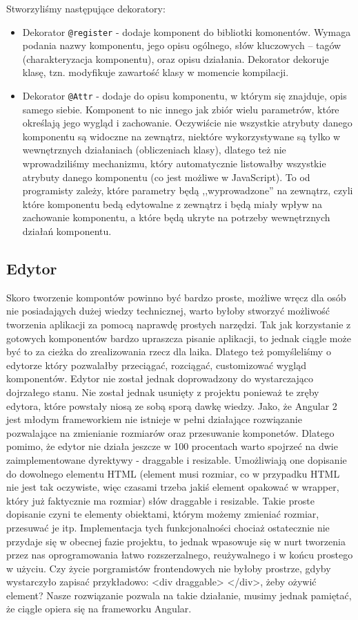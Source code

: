 \documentclass[licencjacka]{pracamgr}
\begin{document}
Stworzyliśmy następujące dekoratory:
\begin{itemize}
	\item Dekorator \texttt{@register} - dodaje komponent do bibliotki komonentów. Wymaga podania nazwy komponentu,
jego opisu ogólnego, słów kluczowych -- tagów (charakteryzacja komponentu),
oraz opisu działania. Dekorator dekoruje klasę, tzn. modyfikuje zawartość
klasy w momencie kompilacji.

	\item Dekorator \texttt{@Attr} - dodaje do opisu komponentu, w którym się znajduje, opis samego siebie.
Komponent to nic innego jak zbiór wielu parametrów, które określają jego wygląd i zachowanie.
Oczywiście nie wszystkie atrybuty danego komponentu są widoczne na zewnątrz, niektóre wykorzystywane
są tylko w wewnętrznych działaniach (obliczeniach klasy), dlatego też nie wprowadziliśmy mechanizmu, który
automatycznie listowałby wszystkie atrybuty danego komponentu (co jest możliwe w JavaScript). To od programisty
zależy, które parametry będą ,,wyprowadzone'' na zewnątrz, czyli które komponentu bedą edytowalne z zewnątrz
i będą miały wpływ na zachowanie komponentu, a które będą ukryte na potrzeby wewnętrznych działań komponentu.
\end{itemize}

\subsection{Edytor}
Skoro tworzenie kompontów powinno być bardzo proste, możliwe wręcz dla osób nie posiadająych dużej wiedzy technicznej, warto byłoby
stworzyć możliwość tworzenia aplikacji za pomocą naprawdę prostych narzędzi. Tak jak korzystanie z gotowych komponentów
bardzo upraszcza pisanie aplikacji, to jednak ciągle może być to za cieżka do zrealizowania rzecz dla laika. Dlatego też pomyśleliśmy
o edytorze który pozwalałby przeciągać, rozciągać, customizować wygląd komponentów. Edytor nie został jednak doprowadzony do wystarczająco dojrzałego
stanu. Nie został jednak usunięty z projektu ponieważ te zręby edytora, które powstały niosą ze sobą sporą dawkę wiedzy. Jako, że Angular 2
jest młodym frameworkiem nie istnieje w pełni działające rozwiązanie pozwalające na zmienianie rozmiarów oraz przesuwanie komponetów.
Dlatego pomimo, że edytor nie działa jeszcze w 100 procentach warto spojrzeć na dwie zaimplementowane dyrektywy - draggable i resizable.
Umożliwiają one dopisanie do dowolnego elementu HTML (element musi rozmiar, co w przypadku HTML nie jest tak oczywiste, więc czasami trzeba
jakiś element opakować w wrapper, który już faktycznie ma rozmiar) słów draggable i resizable. Takie proste dopisanie czyni te elementy
obiektami, którym możemy zmieniać rozmiar, przesuwać je itp. Implementacja tych funkcjonalności chociaż ostatecznie nie przydaje się w obecnej fazie projektu,
to jednak wpasowuje się w nurt tworzenia przez nas oprogramowania łatwo rozszerzalnego, reużywalnego i w końcu prostego w użyciu. Czy życie porgramistów
frontendowych nie byłoby prostrze, gdyby wystarczyło zapisać przykładowo: <div draggable> </div>, żeby ożywić element? Nasze rozwiązanie pozwala na takie działanie,
musimy jednak pamiętać, że ciągle opiera się na frameworku Angular.
\end{document}
